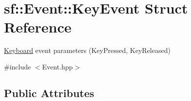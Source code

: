 \hypertarget{structsf_1_1_event_1_1_key_event}{}\section{sf\+:\+:Event\+:\+:Key\+Event Struct Reference}
\label{structsf_1_1_event_1_1_key_event}


\hyperlink{classsf_1_1_keyboard}{Keyboard} event parameters (Key\+Pressed, Key\+Released)  




{\ttfamily \#include $<$Event.\+hpp$>$}

\subsection*{Public Attributes}
